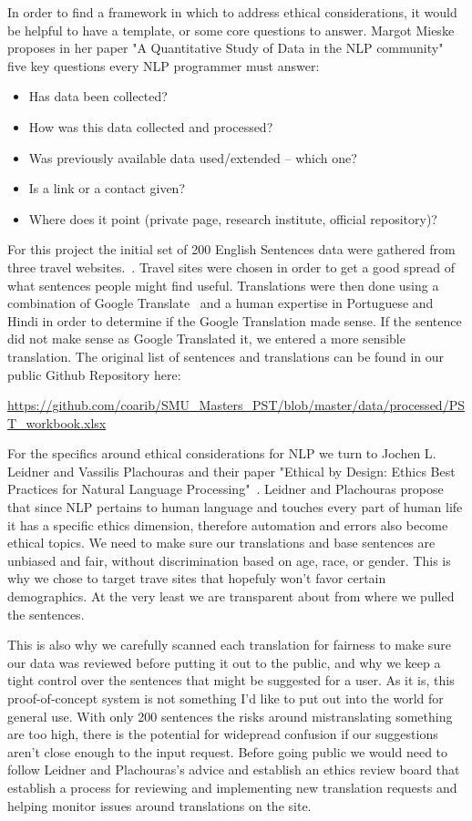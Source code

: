 \documentclass[runningheads]{llncs}
\begin{document}
In order to find a framework in which to address ethical considerations, it would be helpful to have a template, or some core questions to answer. Margot Mieske proposes in her paper "A Quantitative Study of Data in the NLP community" five key questions every NLP programmer must answer: ~\cite{ref_url8}


\begin{itemize}
	\item Has data been collected? 
	\item How was this data collected and processed? 
 	\item Was previously available data used/extended – which one? 
	\item Is a link or a contact given? 
	\item Where does it point (private page, research institute, official repository)?
\end{itemize}

For this project the initial set of 200 English Sentences data were gathered from three travel websites.~\cite{ref_url11,ref_url12,ref_url13}. Travel sites were chosen in order to get a good spread of what sentences people might find useful. Translations were then done using a combination of Google Translate~\cite{ref_url14} and a human expertise in Portuguese and Hindi in order to determine if the Google Translation made sense. If the sentence did not make sense as Google Translated it, we entered a more sensible translation. The original list of sentences and translations can be found in our public Github Repository here:

\url{https://github.com/coarib/SMU_Masters_PST/blob/master/data/processed/PST_workbook.xlsx}


For the specifics around ethical considerations for NLP we turn to Jochen L. Leidner and Vassilis Plachouras and their paper "Ethical by Design: Ethics Best Practices for Natural Language Processing"~\cite{ref_url15}.  Leidner and Plachouras propose that since NLP pertains to human language and touches every part of human life it has a specific ethics dimension, therefore automation and errors also become ethical topics. We need to make sure our translations and base sentences are unbiased and fair, without discrimination based on age, race, or gender. This is why we chose to target trave sites that hopefuly won't favor certain demographics. At the very least we are transparent about from where we pulled the sentences.


This is also why we carefully scanned each translation for fairness to make sure our data was reviewed before putting it out to the public, and why we keep a tight control over the sentences that might be suggested for a user. As it is, this proof-of-concept system is not something I'd like to put out into the world for general use. With only 200 sentences the risks around mistranslating something are too high, there is the potential for widepread confusion if our suggestions aren't close enough to the input request. Before going public we would need to follow Leidner and Plachouras's advice and establish an ethics review board that establish a process for reviewing and implementing new translation requests and helping monitor issues around translations on the site.
\end{document}

